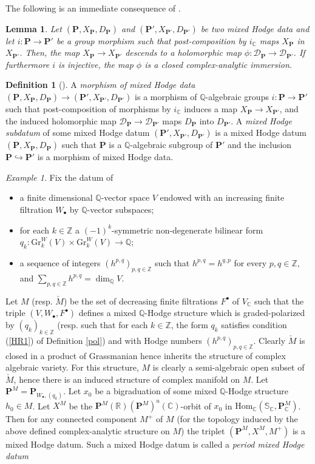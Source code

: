 \documentclass[10pt]{article}
\numberwithin{equation}{subsection}
\theoremstyle{plain}
\newtheorem{lemma}[theorem]{Lemma}
\theoremstyle{definition}
\newtheorem{definition}[theorem]{Definition}
\theoremstyle{remark}
\newtheorem{example}[theorem]{Example}
\newcommand{\Z}{\mathbb Z}
\newcommand{\Q}{\mathbb Q}
\newcommand{\C}{\mathbb C}
\newcommand{\R}{\mathbb R}
\newcommand{\s}{\mathbb S}
\newcommand{\pp}{\mathbf P}
\newcommand{\bul}{\bullet}
\newcommand{\Hom}{\mathrm{Hom}}
\newcommand{\Gr}{\mathrm{Gr}}
\newcommand{\ppol}{\pp_{W_\bul, (q_k)}}
\begin{document}
The following is an immediate consequence of \cite[(1.7)]{pinkthese}.
\begin{lemma}\label{subdatimm}
Let $(\pp, X_\pp, D_\pp)$ and $(\pp',X_{\pp'}, D_{\pp'})$ be two mixed Hodge data and let $i : \pp \rightarrow \pp'$ be a group morphism such that post-composition by $i_\C$ maps $X_\pp$ in $X_{\pp'}$. Then, the map $X_\pp \rightarrow X_{\pp'}$ descends to a holomorphic map $\phi : \mathcal{D}_\pp \rightarrow \mathcal{D}_{\pp'}$. If furthermore $i$ is injective, the map $\phi$ is a closed complex-analytic immersion.
\end{lemma}
\begin{definition}[{\cite[Def. 3.5]{klingler_atyp}}]
A \textit{morphism of mixed Hodge data} $(\pp, X_\pp, D_\pp) \rightarrow (\pp',X_{\pp'}, D_{\pp'})$ is a morphism of $\Q$-algebraic groups $i : \pp \rightarrow \pp'$ such that post-composition of morphisms by $i_\C$ induces a map $X_\pp \rightarrow X_{\pp'}$, and the induced holomorphic map $\mathcal{D}_\pp \rightarrow \mathcal{D}_{\pp'}$ maps $D_\pp$ into $D_{\pp'}$. A \textit{mixed Hodge subdatum} of some mixed Hodge datum $(\pp', X_{\pp'}, D_{\pp'})$ is a mixed Hodge datum $(\pp, X_\pp, D_\pp)$ such that $\pp$ is a $\Q$-algebraic subgroup of $\pp'$ and the inclusion $\pp \hookrightarrow \pp'$ is a morphism of mixed Hodge data.
\end{definition}
\begin{example} Fix the datum of
\begin{itemize}
\item a finite dimensional $\Q$-vector space $V$ endowed with an increasing finite filtration $W_\bul$ by $\Q$-vector subspaces;
\item for each $k \in \Z$ a $(-1)^k$-symmetric non-degenerate bilinear form $q_k : \Gr_k^W(V) \times \Gr_k^W(V) \rightarrow \Q$;
\item a sequence of integers $(h^{p,q})_{p,q \in \Z}$ such that $h^{p,q} = h^{q,p}$ for every $p,q \in \Z$, and $\sum_{p,q \in \Z} h^{p,q} = \dim_\Q V$.
\end{itemize}
Let $M$ (resp. $\check{M}$) be the set of decreasing finite filtrations $F^\bul$ of $V_\C$ such that the triple $(V, W_\bul, F^\bul)$ defines a mixed $\Q$-Hodge structure which is graded-polarized by $(q_k)_{k\in \Z}$ (resp. such that for each $k \in \Z$, the form $q_k$ satisfies condition (\ref{HR1}) of Definition \ref{pol}) and with Hodge numbers $(h^{p,q})_{p,q \in \Z}$. Clearly $\check{M}$ is closed in a product of Grassmanian hence inherits the structure of complex algebraic variety. For this structure, $M$ is clearly a semi-algebraic open subset of $\check{M}$, hence there is an induced structure of complex manifold on $M$. Let $\pp^M = \ppol$. Let $x_0$ be a bigraduation of some mixed $\Q$-Hodge structure $h_0 \in M$. Let $X^M$ be the $\pp^M(\R)(\pp^M)^u(\C)$-orbit of $x_0$ in $\Hom_\C(\s_\C, \pp^M_\C)$. Then for any connected component $M^+$ of $M$ (for the topology induced by the above defined complex-analytic structure on $M$)  the triplet $(\pp^M, X^M, M^+)$ is a mixed Hodge datum. Such a mixed Hodge datum is called a \textit{period mixed Hodge datum}
\end{example}
\end{document}
